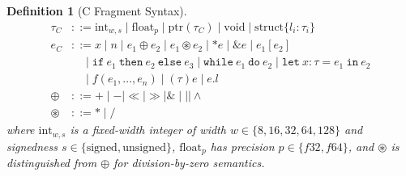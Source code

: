 \documentclass[11pt]{article}
\newtheorem{definition}[theorem]{Definition}
\begin{document}
\begin{definition}[C Fragment Syntax]
\label{def:csyntax}
\begin{align*}
\tau_C &::= \mathrm{int}_{w,s} \mid \mathrm{float}_p \mid \mathrm{ptr}(\tau_C) \mid \mathrm{void} \mid \mathrm{struct}\{l_i : \tau_i\} \\
e_C &::= x \mid n \mid e_1 \oplus e_2 \mid e_1 \circledast e_2 \mid {*}e \mid {\&}e \mid e_1[e_2] \\
    &\quad\mid \texttt{if}\ e_1\ \texttt{then}\ e_2\ \texttt{else}\ e_3 \mid \texttt{while}\ e_1\ \texttt{do}\ e_2 \mid \texttt{let}\ x:\tau = e_1\ \texttt{in}\ e_2 \\
    &\quad\mid f(e_1, \ldots, e_n) \mid (\tau)e \mid e.l \\
\oplus &::= {+} \mid {-} \mid {\ll} \mid {\gg} \mid {\&} \mid {|} \mid {\wedge} \\
\circledast &::= {*} \mid {/}
\end{align*}
where $\mathrm{int}_{w,s}$ is a fixed-width integer of width $w \in \{8, 16, 32, 64, 128\}$ and signedness $s \in \{\mathrm{signed}, \mathrm{unsigned}\}$, $\mathrm{float}_p$ has precision $p \in \{f32, f64\}$, and $\circledast$ is distinguished from $\oplus$ for division-by-zero semantics.
\end{definition}
\end{document}
